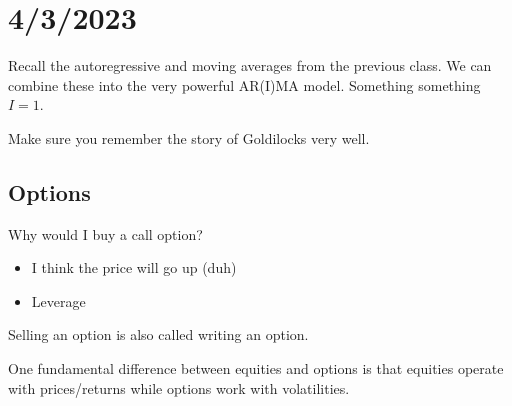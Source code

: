 \chapter{4/3/2023}

Recall the autoregressive and moving averages from the previous class. We can combine these into the very powerful AR(I)MA model. Something something $I=1$.

Make sure you remember the story of Goldilocks very well.

\section{Options}
Why would I buy a call option? \begin{itemize}
	\item I think the price will go up (duh)
	\item Leverage
\end{itemize}
Selling an option is also called writing an option.

One fundamental difference between equities and options is that equities operate with prices/returns while options work with volatilities.


